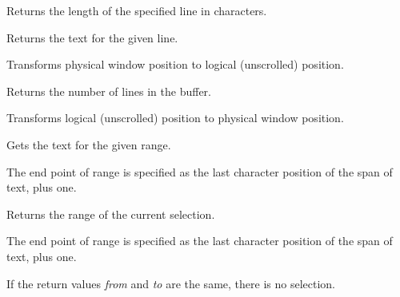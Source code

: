 Returns the length of the specified line in characters.

\label{wxrichtextctrlgetlinetext}


Returns the text for the given line.

\label{wxrichtextctrlgetlogicalpoint}


Transforms physical window position to logical (unscrolled) position.

\label{wxrichtextctrlgetnumberoflines}


Returns the number of lines in the buffer.

\label{wxrichtextctrlgetphysicalpoint}


Transforms logical (unscrolled) position to physical window position.

\label{wxrichtextctrlgetrange}


Gets the text for the given range.

The end point of range is specified as the last character position of the span of text, plus one.

\label{wxrichtextctrlgetselection}


Returns the range of the current selection.

The end point of range is specified as the last character position of the span of text, plus one.

If the return values {\it from} and {\it to} are the same, there is no selection.

\label{wxrichtextctrlgetselectionrange}


